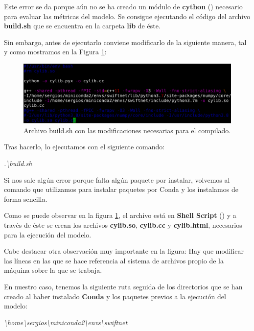 Este error se da porque aún no se ha creado un módulo de \textbf{cython} (\cite{cython}) necesario para evaluar las métricas del modelo. Se consigue ejecutando el código del archivo \textbf{build.sh} que se encuentra en la carpeta \textbf{lib} de éste.

Sin embargo, antes de ejecutarlo conviene modificarlo de la siguiente manera, tal y como mostramos en la Figura \ref{fig:cylib}:

\begin{figure}[H]
  \centering
  \includegraphics[width=12cm]{Figuras/cylib.eps}
  \caption{Archivo build.sh con las modificaciones necesarias para el compilado.}
  \label{fig:cylib}
\end{figure}

Tras hacerlo, lo ejecutamos con el siguiente comando:

\begin{center}
\textit{.\textbackslash{build.sh}}
\end{center}

Si nos sale algún error porque falta algún paquete por instalar, volvemos al comando que utilizamos para instalar paquetes por Conda y los instalamos de forma sencilla.

Como se puede observar en la figura \ref{fig:cylib}, el archivo está en \textbf{Shell Script} (\cite{shell}) y a través de éste se crean los archivos \textbf{cylib.so}, \textbf{cylib.cc} y \textbf{cylib.html}, necesarios para la ejecución del modelo.

Cabe destacar otra observación muy importante en la figura: Hay que modificar las líneas en las que se hace referencia al sistema de archivos propio de la máquina sobre la que se trabaja.

En nuestro caso, tenemos la siguiente ruta seguida de los directorios que se han creado al haber instalado \textbf{Conda} y los paquetes previos a la ejecución del modelo:

\begin{center}
\textit{\textbackslash{home}\textbackslash{sergios}\textbackslash{miniconda2}\textbackslash{envs}\textbackslash{swiftnet}}
\end{center}

